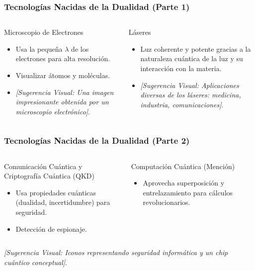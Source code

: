 \documentclass{beamer}
\begin{document}
	\begin{frame}
		\frametitle{Tecnologías Nacidas de la Dualidad (Parte 1)}
		\begin{columns}[T]
			\begin{column}{0.5\textwidth}
				\begin{block}{Microscopio de Electrones}
					\begin{itemize}
						\item Usa la pequeña $\lambda$ de los electrones para alta resolución.
						\item Visualizar átomos y moléculas.
						\item \textit{[Sugerencia Visual: Una imagen impresionante obtenida por un microscopio electrónico]}.
					\end{itemize}
				\end{block}
			\end{column}
			\begin{column}{0.5\textwidth}
				\begin{block}{Láseres}
					\begin{itemize}
						\item Luz coherente y potente gracias a la naturaleza cuántica de la luz y su interacción con la materia.
						\item \textit{[Sugerencia Visual: Aplicaciones diversas de los láseres: medicina, industria, comunicaciones]}.
					\end{itemize}
				\end{block}
			\end{column}
		\end{columns}
	\end{frame}
	
	\begin{frame}
		\frametitle{Tecnologías Nacidas de la Dualidad (Parte 2)}
		\begin{columns}[T]
			\begin{column}{0.5\textwidth}
				\begin{block}{Comunicación Cuántica y Criptografía Cuántica (QKD)}
					\begin{itemize}
						\item Usa propiedades cuánticas (dualidad, incertidumbre) para seguridad.
						\item Detección de espionaje.
					\end{itemize}
				\end{block}
			\end{column}
			\begin{column}{0.5\textwidth}
				\begin{block}{Computación Cuántica (Mención)}
					\begin{itemize}
						\item Aprovecha superposición y entrelazamiento para cálculos revolucionarios.
					\end{itemize}
				\end{block}
			\end{column}
		\end{columns}
		\textit{[Sugerencia Visual: Iconos representando seguridad informática y un chip cuántico conceptual]}.
	\end{frame}
	
\end{document}
